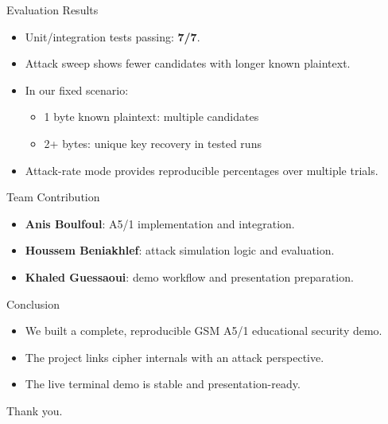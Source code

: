 \documentclass[10pt]{beamer}
\begin{document}
\begin{frame}{Evaluation Results}
\begin{itemize}
  \item Unit/integration tests passing: \textbf{7/7}.
  \item Attack sweep shows fewer candidates with longer known plaintext.
  \item In our fixed scenario:
  \begin{itemize}
    \item 1 byte known plaintext: multiple candidates
    \item 2+ bytes: unique key recovery in tested runs
  \end{itemize}
  \item Attack-rate mode provides reproducible percentages over multiple trials.
\end{itemize}
\end{frame}

\begin{frame}{Team Contribution}
\begin{itemize}
  \item \textbf{Anis Boulfoul}: A5/1 implementation and integration.
  \item \textbf{Houssem Beniakhlef}: attack simulation logic and evaluation.
  \item \textbf{Khaled Guessaoui}: demo workflow and presentation preparation.
\end{itemize}
\end{frame}

\begin{frame}{Conclusion}
\begin{itemize}
  \item We built a complete, reproducible GSM A5/1 educational security demo.
  \item The project links cipher internals with an attack perspective.
  \item The live terminal demo is stable and presentation-ready.
\end{itemize}

\vspace{1em}
\centering
Thank you.
\end{frame}
\end{document}
